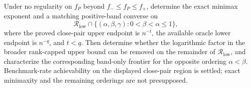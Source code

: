 Under no regularity on \(f_P\) beyond \(f_{-}\leq f_P\leq f_{+}\), determine the exact minimax exponent and a matching positive-band converse on
\[
\mathcal R_{\mathrm{low}}\cap
\{(\alpha,\beta,\gamma):0<\beta<\alpha\leq1\},
\]
where the proved close-pair upper endpoint is \(n^{-t}\), the available oracle lower endpoint is \(n^{-q}\), and \(t<q\).  Then determine whether the logarithmic factor in the broader rank-capped upper bound can be removed on the remainder of \(\mathcal R_{\mathrm{low}}\), and characterize the corresponding band-only frontier for the opposite ordering \(\alpha<\beta\).  Benchmark-rate achievability on the displayed close-pair region is settled; exact minimaxity and the remaining orderings are not presupposed.